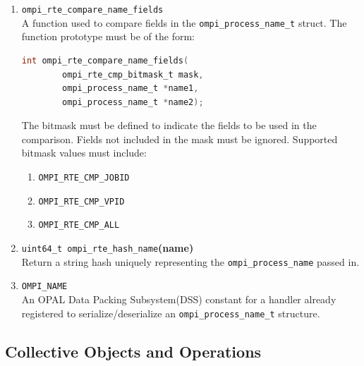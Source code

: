 \begin{enumerate}
\item \verb|ompi_rte_compare_name_fields|\\
  A function used to compare fields in the \verb|ompi_process_name_t| struct. The function prototype must be of the form:
  \begin{lstlisting}[language=C]
  int ompi_rte_compare_name_fields(
        ompi_rte_cmp_bitmask_t mask,
        ompi_process_name_t *name1,
        ompi_process_name_t *name2);
  \end{lstlisting}
  The bitmask must be defined to indicate the fields to be used in the comparison. Fields not included in the mask must be ignored.
        Supported bitmask values must include:
        \begin{enumerate}
          \item \verb|OMPI_RTE_CMP_JOBID|
          \item \verb|OMPI_RTE_CMP_VPID|
          \item \verb|OMPI_RTE_CMP_ALL|
        \end{enumerate}

      \item \verb|uint64_t ompi_rte_hash_name|\textbf{(name)}\\
        Return a string hash uniquely representing the \verb|ompi_process_name| passed in.

      \item \verb|OMPI_NAME|\\
        An OPAL Data Packing Subsystem(DSS) constant for a handler already registered to serialize/deserialize an \verb|ompi_process_name_t| structure.

\end{enumerate}


\subsection{Collective Objects and Operations}

